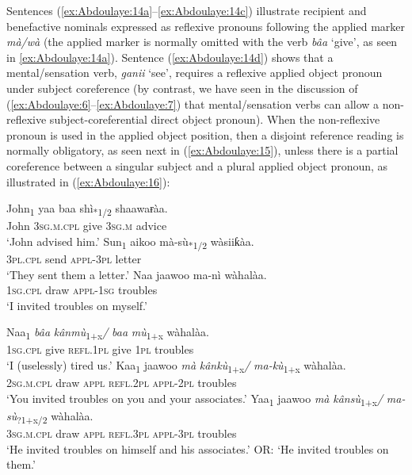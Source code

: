 \documentclass[output=paper]{langscibook}
\begin{document}
Sentences (\ref{ex:Abdoulaye:14a}--\ref{ex:Abdoulaye:14c}) illustrate recipient and benefactive nominals expressed as reflexive pronouns following the applied marker \textit{mà/wà} (the applied marker is normally omitted with the verb \textit{bâa} ‘give’, as seen in \ref{ex:Abdoulaye:14a}). Sentence (\ref{ex:Abdoulaye:14d}) shows that a mental/sensation verb, \textit{ganii} ‘see’, requires a reflexive applied object pronoun under subject coreference (by contrast, we have seen in the discussion of (\ref{ex:Abdoulaye:6}--\ref{ex:Abdoulaye:7}) that mental/sensation verbs can allow a non-reflexive subject-coreferential direct object pronoun). When the non-reflexive pronoun is used in the applied object position, then a disjoint reference reading is normally obligatory, as seen next in (\ref{ex:Abdoulaye:15}), unless there is a partial coreference between a singular subject and a plural applied object pronoun, as illustrated in (\ref{ex:Abdoulaye:16}):

\ea%
    \label{ex:Abdoulaye:15}
    \ea \label{ex:Abdoulaye:15a}
    \gll John\textsubscript{1} yaa  baa  shì\textsubscript{*1/2} shaawaɍàa.\\
    John  \textsc{3sg.m.cpl}  give  \textsc{3sg.m}  advice\\
    \glt `John advised him.’
    \ex \label{ex:Abdoulaye:15b}
   \gll Sun\textsubscript{1} aikoo  mà-sù\textsubscript{*1/2} wàsiiƙàa.\\
    \textsc{3pl.cpl}  send  \textsc{appl-3pl}  letter\\
    \glt `They sent them a letter.’
    \ex \label{ex:Abdoulaye:15c}
   \gll *Naa  jaawoo  ma-nì  wàhalàa.\\
    \textsc{1sg.cpl}  draw  \textsc{appl-1sg}  troubles\\
    \glt `I invited troubles on myself.’
    \z
\z
 
       
\ea%
    \label{ex:Abdoulaye:16}
   \ea  \label{ex:Abdoulaye:16a}
   \gll  Naa\textsubscript{1}  \textit{bâa}  \textit{kânmù}\textsubscript{1+x}\textit{/}  \textit{baa}  \textit{mù}\textsubscript{1+x}  wàhalàa.\\
    \textsc{1sg.cpl}  give  \textsc{refl.1pl}  give  \textsc{1pl}  troubles\\
    \glt `I (uselessly) tired us.’
    \ex  \label{ex:Abdoulaye:16b}
    \gll Kaa\textsubscript{1}  jaawoo  \textit{mà}  \textit{kânkù}\textsubscript{1+x}\textit{/}  \textit{ma-kù}\textsubscript{1+x}  wàhalàa.\\
    \textsc{2sg.m.cpl}  draw  \textsc{appl}  \textsc{refl.2pl}  \textsc{appl-2pl}  troubles\\
    \glt `You invited troubles on you and your associates.’
    \ex  \label{ex:Abdoulaye:16c}
   \gll Yaa\textsubscript{1} jaawoo  \textit{mà}  \textit{kânsù}\textsubscript{1+x}\textit{/}  \textit{ma-sù}\textsubscript{?1+x/2}\textit{\textsubscript{}  }wàhalàa.\\
    \textsc{3sg.m.cpl}  draw  \textsc{appl}  \textsc{refl.3pl}  \textsc{appl-3pl}  troubles\\
    \glt `He invited troubles on himself and his associates.’ OR: `He invited troubles on them.’
    \z
\z 
  
\end{document}
